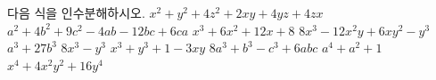 다음 식을 인수분해하시오.
 $x^2+y^2+4z^2+2xy+4yz+4zx$
 $a^2+4b^2+9c^2-4ab-12bc+6ca$
 $x^3+6x^2+12x+8$
 $8x^3-12x^2y+6xy^2-y^3$
 $a^3+27b^3$
 $8x^3-y^3$
 $x^3+y^3+1-3xy$
 $8a^3+b^3-c^3+6abc$
 $a^4+a^2+1$
 $x^4+4x^2y^2+16y^4$
